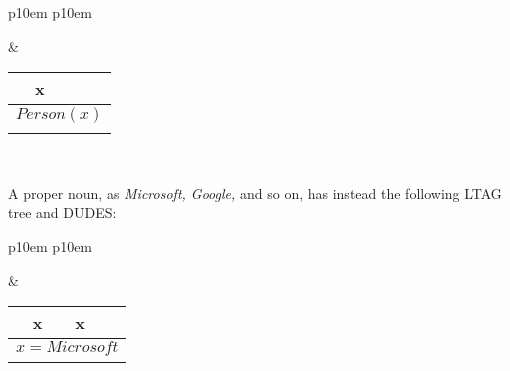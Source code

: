 \medskip
\begin{center}
\begin{tabular}{ p{10em} p{10em} }
	\label{tbl:grammar.people}
	
	\begin{center}
		\begin{tikzpicture}
		\Tree [.NP people ]
		\end{tikzpicture}
	\end{center}
		
	&
	
	\begin{center}
		\begin{tabular}{|c|l|}
			\hline
			x & \mbox{}\\ 
			\hline
			\multicolumn{2}{|l|}{
				$Person(x)$
			} \\
			\hline
			\multicolumn{2}{|l|}{
				\mbox{}
			} \\
			\hline
		\end{tabular}
	\end{center}	
	\\
\end{tabular}
\end{center}
\medskip

A proper noun, as \textit{Microsoft, Google,} and so on, has instead the following LTAG tree and DUDES:
 
\medskip
\begin{center}
\begin{tabular}{ p{10em} p{10em} }
	\label{tbl:grammar.microsoft}
	
	\begin{center}
		\begin{tikzpicture}
		\Tree [.DP Microsoft ]
		\end{tikzpicture}
	\end{center}
		
	&
	
	\begin{center}
		\begin{tabular}{|c|l|}
			\hline
			x & x\\ 
			\hline
			\multicolumn{2}{|l|}{
				$x=Microsoft$
			} \\
			\hline
			\multicolumn{2}{|l|}{
				\mbox{}
			} \\
			\hline
		\end{tabular}
	\end{center}	
	\\
\end{tabular}
\end{center}
\medskip

